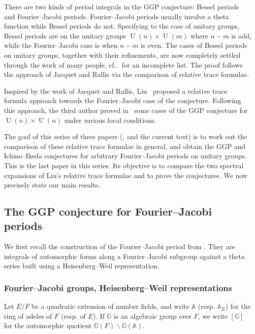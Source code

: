 \documentclass[letterpaper,11pt]{amsart}
\newcommand{\bA}{\mathbb{A}}
\newcommand{\bG}{\mathbb{G}}
\newcommand{\<}{\negthickspace}
\DeclareMathOperator{\U}{U}
\theoremstyle{definition}
\theoremstyle{plain}
\theoremstyle{remark}
\numberwithin{equation}{section}
\begin{document}
There are two kinds of period integrals in the GGP conjecture: Bessel periods
and Fourier--Jacobi periods. Fourier--Jacobi periods usually involve a theta
function while Bessel periods do not. Specifying to the case of unitary
groups, Bessel periods are on the unitary groups $\U(n) \times \U(m)$ where
$n-m$ is odd, while the Fourier--Jacobi case is when $n-m$ is even. The
cases of Bessel periods on unitary groups, together with their refinements,
are now completely settled through the work of many people,
cf.~\cites{JR,Yun,Zhang1,Zhang2,Xue3,BP,BP1,BPLZZ,BPCZ,BPC22} for an
incomplete list. The proof follows the approach of Jacquet and Rallis
via the comparison of relative trace formulae.

Inspired by the work of Jacquet and Rallis, Liu~\cite{Liu} proposed a
relative trace formula approach towards the Fourier--Jacobi case of the conjecture. Following
this approach, the third author proved in~\cites{Xue1,Xue2} some cases of the
GGP conjecture for $\U(n) \times \U(n)$ under various local conditions. 

The goal of this series of three papers (\cite{BLX1}, \cite{BLX2} and the current text) is to work out the comparison of these relative trace formulae in general, and obtain the GGP and Ichino--Ikeda conjectures for arbitrary Fourier--Jacobi periods
on unitary groups. This is the last paper in this series. Its objective is to compare the two spectral expansions of Liu's relative trace formulae and to prove the conjectures. We now precisely state our main results.

\subsection{The GGP conjecture for Fourier--Jacobi periods}
\label{subsec:GGP_intro}

We first recall the construction of the Fourier--Jacobi period from \cite{GGP}. They are integrals of automorphic forms along a Fourier--Jacobi subgroup against a theta series built using a Heisenberg--Weil representation.

\subsubsection{Fourier--Jacobi groups, Heisenberg--Weil representations}
\label{subsubsec:HW_reps}

Let $E/F$ be a quadratic extension of number fields, and write $\bA$ (resp. $\bA_E$) for the ring of adeles of $F$ (resp. of $E$). If $\bG$ is an algebraic group over $F$, we write $[\bG]$ for the automorphic quotient $\bG(F) \backslash \bG(\bA)$.
\end{document}
